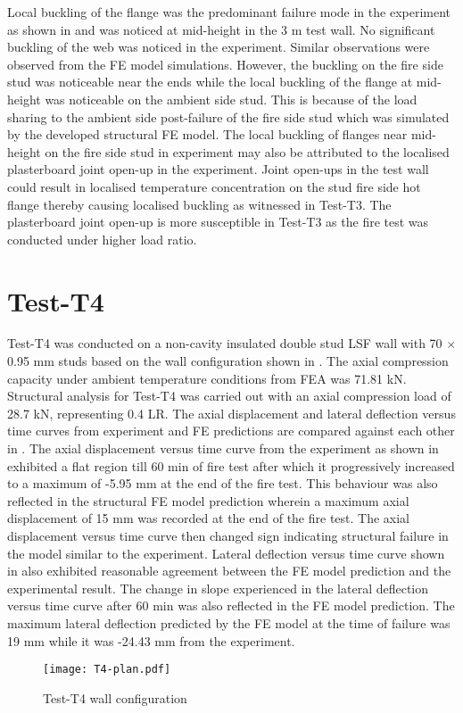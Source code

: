 Local buckling of the flange was the predominant failure mode in the experiment as shown in  and was noticed at mid-height in the 3 m test wall. No significant buckling of the web was noticed in the experiment. Similar observations were observed from the FE model simulations. However, the buckling on the fire side stud was noticeable near the ends while the local buckling of the flange at mid-height was noticeable on the ambient side stud. This is because of the load sharing to the ambient side post-failure of the fire side stud which was simulated by the developed structural FE model. The local buckling of flanges near mid-height on the fire side stud in experiment may also be attributed to the localised plasterboard joint open-up in the experiment. Joint open-ups in the test wall could result in localised temperature concentration on the stud fire side hot flange thereby causing localised buckling as witnessed in Test-T3. The plasterboard joint open-up is more susceptible in Test-T3 as the fire test was conducted under higher load ratio.

\section*{Test-T4}

Test-T4 was conducted on a non-cavity insulated double stud LSF wall with 70 $\times$ 0.95 mm studs based on the wall configuration shown in . The axial compression capacity under ambient temperature conditions from FEA was 71.81 kN. Structural analysis for Test-T4 was carried out with an axial compression load of 28.7 kN, representing 0.4 LR. The axial displacement and lateral deflection versus time curves from experiment and FE predictions are compared against each other in . The axial displacement versus time curve from the experiment as shown in  exhibited a flat region till 60 min of fire test after which it progressively increased to a maximum of -5.95 mm at the end of the fire test. This behaviour was also reflected in the structural FE model prediction wherein a maximum axial displacement of 15 mm was recorded at the end of the fire test. The axial displacement versus time curve then changed sign indicating structural failure in the model similar to the experiment. Lateral deflection versus time curve shown in  also exhibited reasonable agreement between the FE model prediction and the experimental result. The change in slope experienced in the lateral deflection versus time curve after 60 min was also reflected in the FE model prediction. The maximum lateral deflection predicted by the FE model at the time of failure was 19 mm while it was -24.43 mm from the experiment. 
\begin{figure}[!htbp]
	\centering
			\texttt{[image: T4-plan.pdf]}\\
		\caption{Test-T4 wall configuration}
		\label{fig:T4-plan-FEA}
\end{figure}

